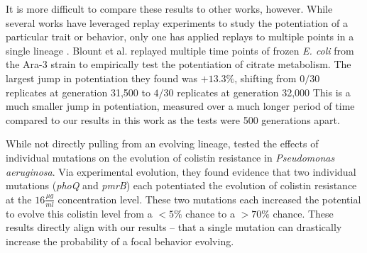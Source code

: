 It is more difficult to compare these results to other works, however. 
While several works have leveraged replay experiments to study the potentiation of a particular trait or behavior, only one has applied replays to multiple points in a single lineage \citep{blountHistoricalContingencyEvolution2008}.
Blount et al. replayed multiple time points of frozen \textit{E. coli} from the Ara-3 strain to empirically test the potentiation of citrate metabolism. 
The largest jump in potentiation they found was \localapprox $+13.3\%$, shifting from $0/30$ replicates at generation 31,500 to $4/30$ replicates at generation 32,000 %
This is a much smaller jump in potentiation, measured over a much longer period of time compared to our results in this work as the tests were 500 generations apart.



While not directly pulling from an evolving lineage, \citet{jochumsenEvolutionAntimicrobialPeptide2016a} tested the effects of individual mutations on the evolution of colistin resistance in \textit{Pseudomonas aeruginosa}. 
Via experimental evolution, they found evidence that two individual mutations (\textit{phoQ} and \textit{pmrB}) each potentiated the evolution of colistin resistance at the $16\frac{\mu g}{ml}$ concentration level.
These two mutations each increased the potential to evolve this colistin level from  a $<5\%$ chance to a $>70\%$ chance. 
These results directly align with our results -- that a single mutation can drastically increase the probability of a focal behavior evolving. 


